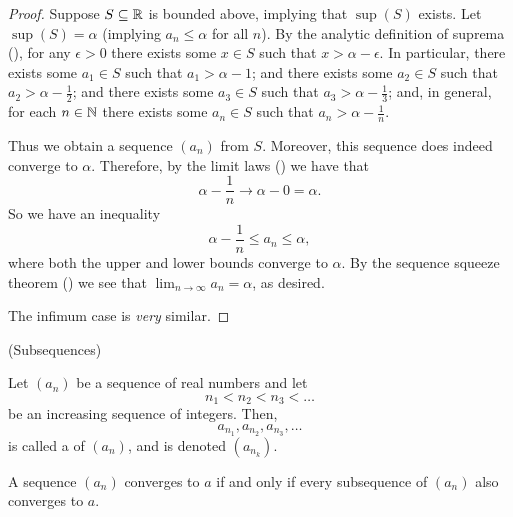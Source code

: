 \begin{proof}
  Suppose $S \subseteq \mathbb R$ is bounded above, implying that $\sup(S)$
  exists. Let $\sup(S) = \alpha$ (implying $a_n \leq \alpha$ for all
  $n$). By the analytic definition of suprema
  (), for any
  $\epsilon > 0$ there exists some $x \in S$ such that $x > \alpha -
  \epsilon$. In particular, there exists some $a_1 \in S$ such that
  $a_1 > \alpha - 1$; and there exists some $a_2 \in S$ such that
  $a_2 > \alpha - \frac{1}{2}$; and there exists some $a_3 \in S$
  such that $a_3 > \alpha - \frac{1}{3}$; and, in general, for each
  $n \in \mathbb N$ there exists some $a_n \in S$ such that $a_n > \alpha -
  \frac{1}{n}$.

  Thus we obtain a sequence $(a_n)$ from $S$. Moreover, this sequence
  does indeed converge to $\alpha$. Therefore, by
  the limit laws () we have that
  \[ \alpha - \frac{1}{n} \to \alpha - 0 = \alpha. \]
  So we have an inequality
  \[ \alpha - \frac{1}{n} \leq a_n \leq \alpha, \]
  where both the upper and lower bounds converge to $\alpha$. By the
  sequence squeeze theorem () we see that $\lim_{n \to
  \infty} a_n = \alpha$, as desired.

  The infimum case is \textit{very} similar.
\end{proof}

\begin{definition}(Subsequences)
  Let $(a_n)$ be a sequence of real numbers and let
  \[ n_1 < n_2 < n_3 < \dots \]
  be an increasing sequence of integers. Then,
  \[ a_{n_1}, a_{n_2}, a_{n_3}, \dots \]
  is called a  of $(a_n)$, and is denoted $(a_{n_k})$.
\end{definition}

\begin{proposition}
  A sequence $(a_n)$ converges to $a$ if and only if every
  subsequence of $(a_n)$ also converges to $a$.
\end{proposition}

